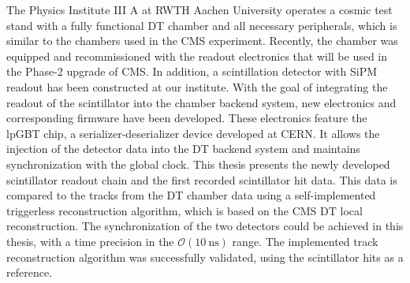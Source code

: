 \vspace{-0.5cm}
The Physics Institute III A at RWTH Aachen University operates a cosmic test stand with a fully functional \ac{DT} chamber and all necessary peripherals, which is similar to the chambers used in the \ac{CMS} experiment. Recently, the chamber was equipped and recommissioned with the readout electronics that will be used in the Phase-2 upgrade of CMS. In addition, a scintillation detector with \ac{SiPM} readout has been constructed at our institute. With the goal of integrating the readout of the scintillator into the chamber backend system, new electronics and corresponding firmware have been developed. These electronics feature the \ac{lpGBT} chip, a serializer-deserializer device developed at \acs{CERN}. It allows the injection of the detector data into the \ac{DT} backend system and maintains synchronization with the global clock. This thesis presents the newly developed scintillator readout chain and the first recorded scintillator hit data. This data is compared to the tracks from the \ac{DT} chamber data using a self-implemented triggerless reconstruction algorithm, which is based on the \ac{CMS} \ac{DT} local reconstruction. The synchronization of the two detectors could be achieved in this thesis, with a time precision in the $\mathcal{O}(\SI{10}{\nano\second})$ range. The implemented track reconstruction algorithm was successfully validated, using the scintillator hits as a reference.

\acresetall